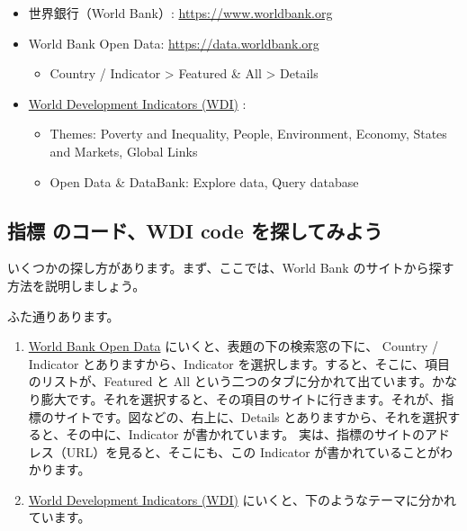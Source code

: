 \documentclass[
  xelatex, ja=standard]{bxjsbook}
\providecommand{\tightlist}{%
  \setlength{\itemsep}{0pt}\setlength{\parskip}{0pt}}
\theoremstyle{definition}
\theoremstyle{definition}
\theoremstyle{definition}
\theoremstyle{definition}
\theoremstyle{remark}
\begin{document}
\begin{itemize}
\tightlist
\item
  世界銀行（World Bank）: \url{https://www.worldbank.org}
\item
  World Bank Open Data: \url{https://data.worldbank.org}

  \begin{itemize}
  \tightlist
  \item
    Country / Indicator \textgreater{} Featured \& All \textgreater{} Details
  \end{itemize}
\item
  \href{https://datatopics.worldbank.org/world-development-indicators/}{World Development Indicators (WDI)} :

  \begin{itemize}
  \tightlist
  \item
    Themes: Poverty and Inequality, People, Environment, Economy, States and Markets, Global Links
  \item
    Open Data \& DataBank: Explore data, Query database
  \end{itemize}
\end{itemize}

\hypertarget{ux6307ux6a19-ux306eux30b3ux30fcux30c9wdi-code-ux3092ux63a2ux3057ux3066ux307fux3088ux3046}{%
\subsection{指標 のコード、WDI code を探してみよう}\label{ux6307ux6a19-ux306eux30b3ux30fcux30c9wdi-code-ux3092ux63a2ux3057ux3066ux307fux3088ux3046}}

いくつかの探し方があります。まず、ここでは、World Bank のサイトから探す方法を説明しましょう。

ふた通りあります。

\begin{enumerate}
\def\labelenumi{\arabic{enumi}.}
\item
  \href{https://data.worldbank.org}{World Bank Open Data} にいくと、表題の下の検索窓の下に、 Country / Indicator とありますから、Indicator を選択します。すると、そこに、項目のリストが、Featured と All という二つのタブに分かれて出ています。かなり膨大です。それを選択すると、その項目のサイトに行きます。それが、指標のサイトです。図などの、右上に、Details とありますから、それを選択すると、その中に、Indicator が書かれています。 実は、指標のサイトのアドレス（URL）を見ると、そこにも、この Indicator が書かれていることがわかります。
\item
  \href{https://datatopics.worldbank.org/world-development-indicators/}{World Development Indicators (WDI)} にいくと、下のようなテーマに分かれています。
\end{enumerate}
\end{document}
